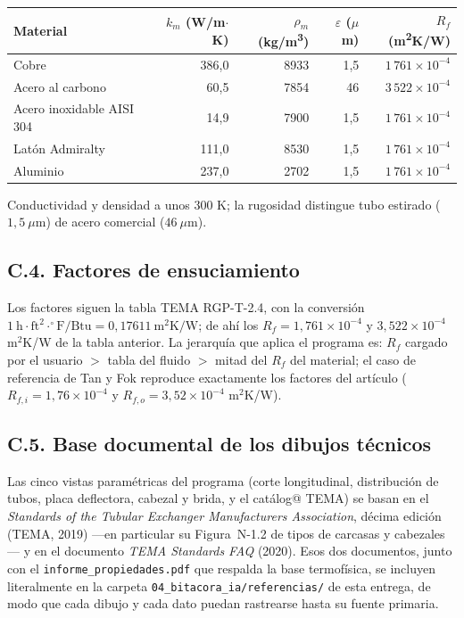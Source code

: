 \documentclass[11pt,a4paper]{article}
\begin{document}
\begin{center}
{\small
\begin{tabular}{@{}lrrrr@{}}
\toprule
\textbf{Material} & \textbf{$k_m$ (W/m$\cdot$K)} & \textbf{$\rho_m$ (kg/m\textsuperscript{3})} & \textbf{$\varepsilon$ ($\mu$m)} & \textbf{$R_f$ (m\textsuperscript{2}K/W)} \\
\midrule
Cobre & 386,0 & 8933 & 1,5 & $1\,761\times 10^{-4}$ \\
Acero al carbono & 60,5 & 7854 & 46 & $3\,522\times 10^{-4}$ \\
Acero inoxidable AISI 304 & 14,9 & 7900 & 1,5 & $1\,761\times 10^{-4}$ \\
Lat\'on Admiralty & 111,0 & 8530 & 1,5 & $1\,761\times 10^{-4}$ \\
Aluminio & 237,0 & 2702 & 1,5 & $1\,761\times 10^{-4}$ \\
\bottomrule
\end{tabular}}
\end{center}

Conductividad y densidad a unos $300$ K; la rugosidad distingue tubo
estirado ($1{,}5~\mu\mathrm{m}$) de acero comercial ($46~\mu\mathrm{m}$).

\subsection*{C.4. Factores de ensuciamiento}

Los factores siguen la tabla TEMA RGP-T-2.4, con la conversi\'on
$1~\mathrm{h\cdot ft^2\cdot ^\circ F/Btu} = 0{,}17611~\mathrm{m^2 K/W}$;
de ah\'i los $R_f = 1{,}761\times 10^{-4}$ y $3{,}522\times 10^{-4}$
m$^2$K/W de la tabla anterior. La jerarqu\'ia que aplica el programa es:
$R_f$ cargado por el usuario $>$ tabla del fluido $>$ mitad del $R_f$ del
material; el caso de referencia de Tan y Fok reproduce exactamente los
factores del art\'iculo ($R_{f,i} = 1{,}76\times 10^{-4}$ y
$R_{f,o} = 3{,}52\times 10^{-4}$ m$^2$K/W).


\subsection*{C.5. Base documental de los dibujos t\'ecnicos}

Las cinco vistas param\'etricas del programa (corte longitudinal,
distribuci\'on de tubos, placa deflectora, cabezal y brida, y el cat\'alog@
TEMA) se basan en el \emph{Standards of the Tubular Exchanger Manufacturers
Association}, d\'ecima edici\'on (TEMA, 2019) ---en particular su
Figura~N-1.2 de tipos de carcasas y cabezales--- y en el documento
\emph{TEMA Standards FAQ} (2020). Esos dos documentos, junto con el
\texttt{informe\_propiedades.pdf} que respalda la base termof\'isica, se
incluyen literalmente en la carpeta
\texttt{04\_bitacora\_ia/referencias/} de esta entrega, de modo que cada
dibujo y cada dato puedan rastrearse hasta su fuente primaria.
\end{document}
